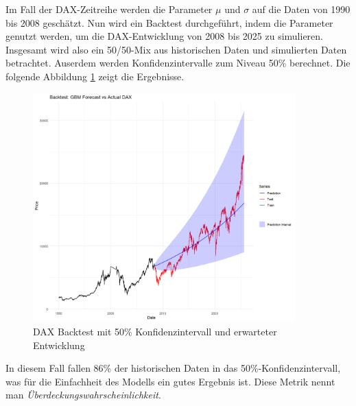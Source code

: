 \begin{bsp}
Im Fall der DAX-Zeitreihe werden die Parameter $\mu$ und $\sigma$ auf die Daten von 1990 bis 2008 geschätzt.
Nun wird ein Backtest durchgeführt, indem die Parameter genutzt werden, um die DAX-Entwicklung von 2008 bis 2025 zu simulieren. Insgesamt 
wird also ein 50/50-Mix aus historischen Daten und simulierten Daten betrachtet. Auserdem 
werden Konfidenzintervalle zum Niveau 50\% berechnet. Die folgende Abbildung
\ref{fig:dax_backtest} zeigt die Ergebnisse.

\begin{figure}[H]
    \centering
    \includegraphics[width=0.9\textwidth]{images/dax_backtest.png}
    \caption{DAX Backtest mit 50\% Konfidenzintervall und erwarteter Entwicklung}
    \label{fig:dax_backtest}
\end{figure}

In diesem Fall fallen 86\% der historischen Daten in das 50\%-Konfidenzintervall,
was für die Einfachheit des Modells ein gutes Ergebnis ist. Diese Metrik nennt 
man \textit{Überdeckungswahrscheinlichkeit}.

\end{bsp}

